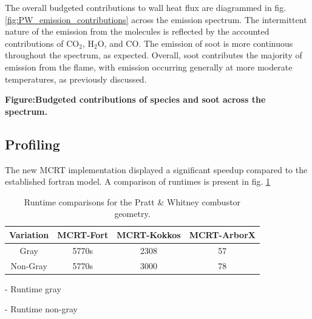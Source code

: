 The overall budgeted contributions to wall heat flux are diagrammed in fig. \ref{fig:PW_emission_contributions} across the emission spectrum.
The intermittent nature of the emission from the molecules is reflected by the accounted contributions of CO$_2$, H$_2$O, and CO. The emission of soot is more continuous throughout the spectrum, as expected.
Overall, soot contributes the majority of emission from the flame, with emission occurring generally at more moderate temperatures, as previously discussed.

\textbf{Figure:Budgeted contributions of species and soot across the spectrum.}

\subsection{Profiling}
The new MCRT implementation displayed a significant speedup compared to the established fortran model. A comparison of runtimes is present in fig. \ref{table:PW_runtime_table}

\begin{table}[h!]
\centering
\begin{tabular}{||c c c c||} 
 \hline
 Variation & MCRT-Fort & MCRT-Kokkos & MCRT-ArborX \\ [0.5ex] 
 \hline\hline
 Gray & 5770s     & 2308 & 57  \\ %
 Non-Gray & 5770s & 3000 & 78 \\ [1ex] 
 \hline
\end{tabular}
\caption{Runtime comparisons for the Pratt \& Whitney combustor geometry.}
\label{table:PW_runtime_table}
\end{table}


- Runtime gray

- Runtime non-gray


